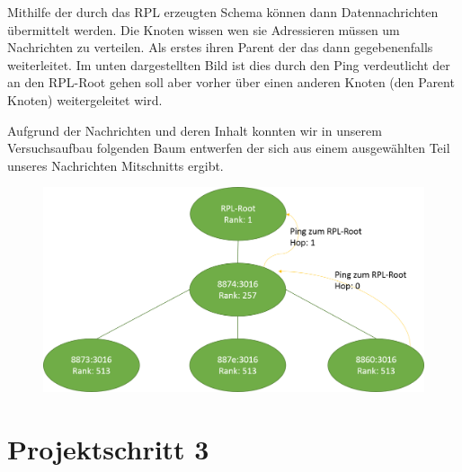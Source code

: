\documentclass[]{scrartcl}
\begin{document}
Mithilfe der durch das RPL erzeugten Schema können dann Datennachrichten übermittelt werden. Die Knoten wissen wen sie Adressieren müssen um Nachrichten zu verteilen. Als erstes ihren Parent der das dann gegebenenfalls weiterleitet. Im unten dargestellten Bild ist dies durch den Ping verdeutlicht der an den RPL-Root gehen soll aber vorher über einen anderen Knoten (den Parent Knoten) weitergeleitet wird.

Aufgrund der Nachrichten und deren Inhalt konnten wir in unserem Versuchsaufbau folgenden Baum entwerfen der sich aus einem ausgewählten Teil unseres Nachrichten Mitschnitts ergibt.

\begin{figure}[H]
	\centering
	\includegraphics[width=1\linewidth]{RPL_Baum.png}
	\label{fig:RPL_Baum}
\end{figure}


\section{Projektschritt 3}
\end{document}
